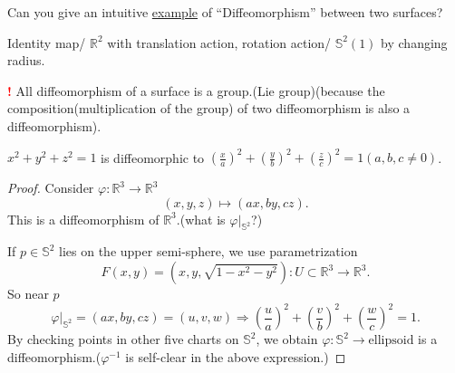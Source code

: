 \begin{question}
    Can you give an intuitive \underline{example} of ``Diffeomorphism''
    between two surfaces?
\end{question}
\begin{example}
    Identity map/ $\mathbb{R}^2$ with translation action, rotation action/
    $\mathbb{S}^2(1)$ by changing radius.
\end{example}
{\Large\textcolor{red}{\textbf{!}}} {All diffeomorphism of a surface}
is a
group.(Lie group)(because the composition(multiplication of the group)
of two diffeomorphism is also a diffeomorphism).
\begin{example}
    ${x^2+y^2+z^2=1}$ is diffeomorphic to ${\left(\frac{x}{a}\right)^2
                +\left(\frac{y}{b}\right)^2+\left(\frac{z}{c}\right)^2=1}(a,b,c\neq 0)$.
\end{example}
\begin{proof}
    Consider $\varphi \colon \mathbb{R}^3\to \mathbb{R}^3$
    \[
        (x,y,z)\mapsto (ax,by,cz).
    \]
    This is a diffeomorphism of $\mathbb{R}^3$.(what is $\varphi|_{\mathbb{S}^2}$?)

    If $p\in \mathbb{S}^2$ lies on the upper semi-sphere, we use
    parametrization
    \[
        F(x,y)=(x,y,\sqrt{1-x^2-y^2})\colon U\subset \mathbb{R}^3\to \mathbb
        {R}^3    .
    \]
    So near $p$
    \[
        \varphi|_{\mathbb{S}^2}=(ax,by,cz)=(u,v,w)\Rightarrow
        \left(\frac{u}{a}\right)^2
        +\left(\frac{v}{b}\right)^2+\left(\frac{w}{c}\right)^2=1
        .\]
    By checking points in other five charts on $\mathbb{S}^2$, we obtain $\varphi\colon \mathbb{S}^2\to \text{ellipsoid}$ is a diffeomorphism.($\varphi^{-1}$ is self-clear in the above expression.)
\end{proof}
